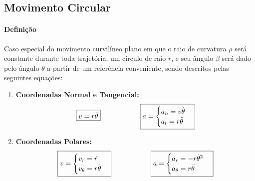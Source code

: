 \documentclass{article}
\begin{document}
        \subsection{Movimento Circular}
            \paragraph{Definição}Caso especial do movimento curvilíneo plano em que o raio de curvatura $\rho$ será constante durante toda trajetória, um círculo de raio $r$, e seu ângulo $\beta$ será dado pelo ângulo $\theta$ a partir de um referência conveniente, sendo descritos pelas seguintes equações:
                \begin{enumerate}
                    \item \textbf{Coordenadas Normal e Tangencial:}
                        \begin{equation}
                            \boxed{
                                v = r \dot{\theta}
                            }
                            \hspace{20mm}
                            \boxed{
                                a = 
                                \begin{cases}
                                    a_{n} = v \dot{\theta}\\
                                    a_{t} = r \ddot{\theta}\\
                                \end{cases}
                            }
                        \end{equation}
                    \item \textbf{Coordenadas Polares:}
                        \begin{equation}
                            \boxed{
                                v = 
                                \begin{cases}
                                    v_{r} = \dot{r}\\
                                    v_{\theta} = r \dot{\theta}\\
                                \end{cases}
                            }
                            \hspace{20mm}
                            \boxed{
                                a = 
                                \begin{cases}
                                    a_{r} = - r\dot{\theta}^{2}\\
                                    a_{\theta} = r \ddot{\theta}\\
                                \end{cases}
                            }
                        \end{equation}
                \end{enumerate}
\end{document}
